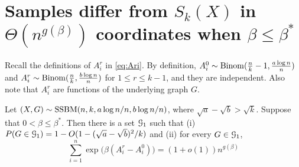 \documentclass{article}
\begin{document}
\section{Samples differ from $S_k(X)$ in $\Theta(n^{g(\beta)})$ coordinates when $\beta\le\beta^\ast$}  \label{sect:struct}
Recall the definitions of $A^r_i$ in \eqref{eq:Ari}.
By definition,
$A^0_i\sim \operatorname{Binom}(\frac{n}{k}-1,\frac{a\log n}{n})$ and $A^r_i\sim \operatorname{Binom}(\frac{n}{k}, \frac{b\log n}{n})$ for $1\leq r \leq k-1$,
and they are independent.
Also note that $A^r_i$ are functions of the underlying graph $G$.

\begin{proposition}  \label{prop:con}
Let $(X,G)\sim \operatorname{SSBM}(n,k, a\log n/n, b\log n/n)$, where $\sqrt{a}-\sqrt{b} > \sqrt{k}$.
Suppose that $0< \beta \le \beta^\ast$.
Then there is a set $\mathcal{G}_{1}$ such that (i) $P(G \in \mathcal{G}_{1}) = 1-O({1-(\sqrt{a}-\sqrt{b})^2/k})$ and (ii) for every $G\in \mathcal{G}_{1}$, 
$$
\sum_{i=1}^n \exp\big(\beta (A^r_i-A^0_i) \big)
=(1+o(1)) n^{g(\beta)}
$$
\end{proposition}
\end{document}
